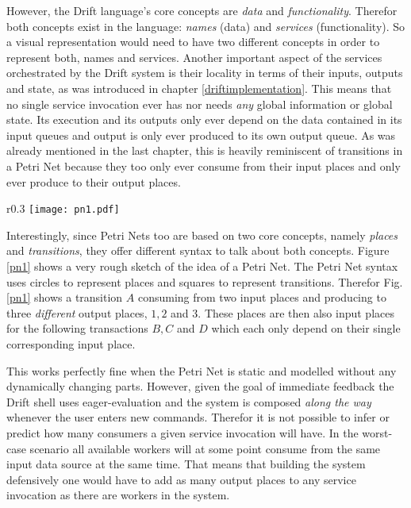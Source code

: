 However, the Drift language's core concepts are \textit{data}
and \textit{functionality}. Therefor both concepts exist in
the language: \textit{names} (data) and \textit{services}
(functionality). So a visual representation would need to
have two different concepts in order to represent both, names
and services.
Another important aspect of the services orchestrated by the
Drift system is their locality in terms of their inputs, outputs and
state, as was introduced in chapter
\ref{driftimplementation}. This means that no single service
invocation ever has nor needs \textit{any} global information
or global state. Its execution and its outputs only ever depend
on the data contained in its input queues and output is only
ever produced to its own output queue. As was already mentioned
in the last chapter, this is heavily reminiscent of transitions
in a Petri Net because they too only ever consume from their
input places and only ever produce to their output places.

\begin{wrapfigure}{r}{0.3\textwidth}
  \texttt{[image: pn1.pdf]}
  \caption{Rough sketch example of a Petri Net.}
  \label{pn1}
\end{wrapfigure}

Interestingly, since Petri Nets too are based on two core concepts,
namely \textit{places} and \textit{transitions}, they offer different
syntax to talk about both concepts. Figure \ref{pn1} shows a very
rough sketch of the idea of a Petri Net. The Petri Net syntax
uses circles to represent places and squares to represent transitions.
Therefor Fig.\ref{pn1} shows a transition $A$ consuming from two
input places and producing to three \textit{different} output places,
$1, 2$ and $3$. These places are then also input places for the
following transactions $B, C$ and $D$ which each only depend
on their single corresponding input place.

This works perfectly fine when the Petri Net is static and modelled
without any dynamically changing parts. However, given the goal
of immediate feedback the Drift shell uses eager-evaluation and
the system is composed \textit{along the way} whenever the user
enters new commands.
Therefor it is not possible to infer or predict how many consumers
a given service invocation will have. In the worst-case scenario
all available workers will at some point consume from the
same input data source at the same time. That means that building the
system defensively one would have to add as many output places to any
service invocation as there are workers in the system.

